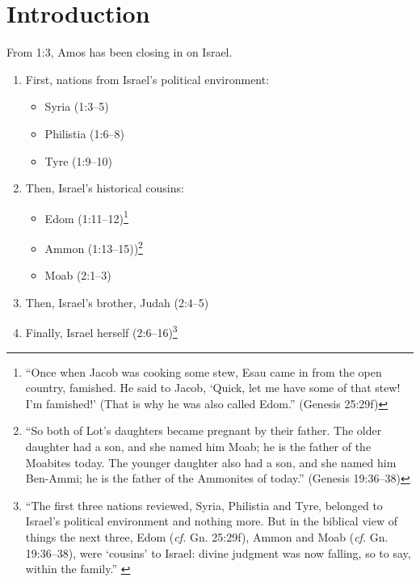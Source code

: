 \newcommand{\Date}{March 25, 2019}
\newcommand{\Title}{Bible Notes: Amos 2}



\section{Introduction}

From 1:3, Amos has been closing in on Israel.

\begin{enumerate}
    \item First, nations from Israel's political environment:
        \begin{itemize}
            \item Syria (1:3--5)
            \item Philistia (1:6--8)
            \item Tyre (1:9--10)
        \end{itemize}
    \item Then, Israel's historical cousins:
        \begin{itemize}
            \item Edom (1:11--12)\footnote{%
                    \enquote{Once when Jacob was cooking some stew, Esau came in
                    from the open country, famished. He said to Jacob,
                    \enquote{Quick, let me have some of that stew! I'm
                    famished!} (That is why he was also called Edom.} (Genesis
                    25:29f)
                }
            \item Ammon (1:13--15))\footnote{%
                    \enquote{So both of Lot's daughters became pregnant by their
                    father. The older daughter had a son, and she named him
                    Moab; he is the father of the Moabites today. The younger
                    daughter also had a son, and she named him Ben-Ammi; he is
                    the father of the Ammonites of today.} (Genesis 19:36--38)
                }
            \item Moab (2:1--3)
        \end{itemize}
    \item Then, Israel's brother, Judah (2:4--5)
    \item Finally, Israel herself (2:6--16)\footnote{%
            \enquote{The first three nations reviewed, Syria, Philistia and
            Tyre, belonged to Israel's political environment and nothing more.
            But in the biblical view of things the next three, Edom
            (\textit{cf.} Gn.  25:29f), Ammon and Moab (\textit{cf.} Gn.
            19:36--38), were \enquote{cousins} to Israel: divine judgment was
            now falling, so to say, within the family.}
            \autocite[50]{motyer:2011}}
\end{enumerate}

